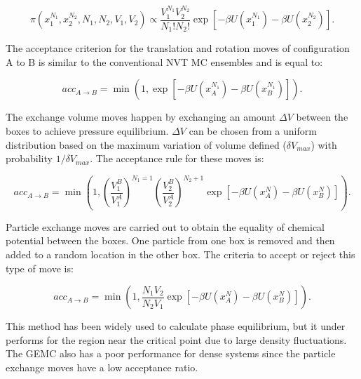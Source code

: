 	\begin{equation}
	\pi(x_{1}^{N_{1}},x_{2}^{N_{2}},N_{1},N_{2},V_{1},V_{2}) \propto \dfrac{V_{1}^{N_{1}}V_{2}^{N_{2}}}{N_{1}!N_{2}!} \exp[-\beta U(x_{1}^{N_{1}}) -\beta U(x_{2}^{N_{2}})] .
	\label{eqn:geprob}
	\end{equation}
	
	The acceptance criterion for the translation and rotation moves of configuration A	to B is similar to the conventional NVT MC ensembles and is equal to:
	
	\begin{equation}
	acc_{A \rightarrow B} = \min(1,\exp[-\beta U(x_{A}^{N_{1}}) -\beta U(x_{B}^{N_{1}})]) .
	\label{eqn:drprob}
	\end{equation} 
	
	The exchange volume moves happen by exchanging an amount $\Delta V$ between the boxes to achieve pressure equilibrium. $\Delta V$ can be chosen from a uniform distribution based on the maximum variation of volume defined ($\delta V_{max}$) with probability $1/\delta V_{max}$. The acceptance rule for these moves is: 
	
	\begin{equation}
	acc_{A \rightarrow B} = \min \left(1, \left(\dfrac{V_{1}^{B}}{V_{1}^{A}} \right)^{N_{1}=1} \left( \dfrac{V_{2}^{B}}{V_{2}^{A}} \right)^{N_{2}+1} \exp[-\beta U(x_{A}^{N}) -\beta U(x_{B}^{N})] \right) .
	\label{vprob}
	\end{equation}
	
	Particle exchange moves are carried out to obtain the equality of chemical potential between the boxes. One particle from one box is removed and then added to a random location in the other box. The criteria to accept or reject this type of move is:
	
	\begin{equation}
	acc_{A \rightarrow B} = \min \left( 1, \dfrac{N_{1}V_{2}}{N_{2}V_{1}}  \exp[-\beta U(x_{A}^{N}) -\beta U(x_{B}^{N})] \right) .
	\label{moleprob}
	\end{equation}
	
	This method has been widely used to calculate phase equilibrium, but it under performs for the region near the critical point due to large density fluctuations. The GEMC also has a poor performance for dense systems since the particle exchange moves have a low acceptance ratio.  
	
	
	
	
	
